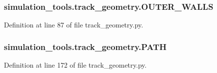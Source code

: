 \subsubsection[{\texorpdfstring{O\+U\+T\+E\+R\+\_\+\+W\+A\+L\+LS}{OUTER_WALLS}}]{\setlength{\rightskip}{0pt plus 5cm}simulation\+\_\+tools.\+track\+\_\+geometry.\+O\+U\+T\+E\+R\+\_\+\+W\+A\+L\+LS}\hypertarget{namespacesimulation__tools_1_1track__geometry_a3f102165140d5e7d0669796d86d7eef4}{}\label{namespacesimulation__tools_1_1track__geometry_a3f102165140d5e7d0669796d86d7eef4}


Definition at line 87 of file track\+\_\+geometry.\+py.

\subsubsection[{\texorpdfstring{P\+A\+TH}{PATH}}]{\setlength{\rightskip}{0pt plus 5cm}simulation\+\_\+tools.\+track\+\_\+geometry.\+P\+A\+TH}\hypertarget{namespacesimulation__tools_1_1track__geometry_a01bbe2fcde345b5a30e2642e8ff46947}{}\label{namespacesimulation__tools_1_1track__geometry_a01bbe2fcde345b5a30e2642e8ff46947}


Definition at line 172 of file track\+\_\+geometry.\+py.

